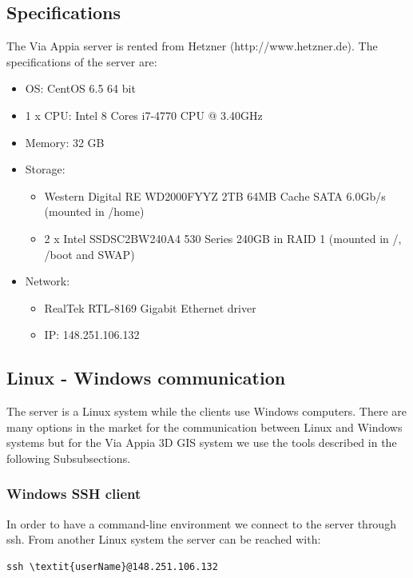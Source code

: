 \documentclass[a4paper,11pt]{article}
\begin{document}
\subsection{Specifications}

The Via Appia server is rented from Hetzner (http://www.hetzner.de). The specifications of the server are:

\begin{itemize}
\item OS: CentOS 6.5 64 bit
\item 1 x CPU: Intel 8 Cores i7-4770 CPU @ 3.40GHz
\item Memory: 32 GB
\item Storage:
\begin{itemize}
\item Western Digital RE WD2000FYYZ 2TB 64MB Cache SATA 6.0Gb/s (mounted in /home)
\item 2 x Intel SSDSC2BW240A4 530 Series 240GB in RAID 1 (mounted in /, /boot and SWAP)
\end{itemize}
\item Network: 
\begin{itemize}
\item RealTek RTL-8169 Gigabit Ethernet driver
\item IP: 148.251.106.132
\end{itemize}
\end{itemize}

\subsection{Linux - Windows communication}
\label{sec:com}
The server is a Linux system while the clients use Windows computers. There are many options in the market for the communication between Linux and Windows systems but for the Via Appia 3D GIS system we use the tools described in the following Subsubsections.

\subsubsection{Windows SSH client}
\label{sec:putty}

In order to have a command-line environment we connect to the server through ssh. From another Linux system the server can be reached with:

\begin{Verbatim}[fontfamily=courier,commandchars=\\\{\},fontsize=\footnotesize]
ssh \textit{userName}@148.251.106.132
\end{Verbatim}
\end{document}

